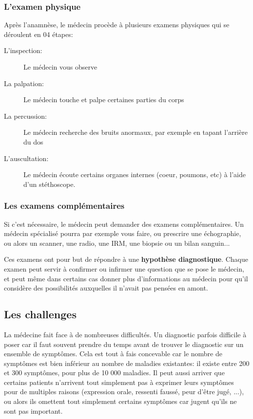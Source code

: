 \subsubsection{L'examen physique}
Après l'anamnèse, le médecin procède à plusieurs examens physiques qui se déroulent en 04 étapes:
\begin{description}
    \item[L'inspection:] Le médecin vous observe
    \item[La palpation:] Le médecin touche et palpe certaines parties du corps
    \item[La percussion:] Le médecin recherche des bruits anormaux, par exemple en tapant l'arrière du dos
    \item[L'auscultation:] Le médecin écoute certains organes internes (coeur, poumons, etc) à l'aide d'un stéthoscope.
\end{description}

\subsubsection{Les examens complémentaires}
Si c'est nécessaire, le médecin peut demander des examens complémentaires. Un médecin spécialisé pourra par exemple vous faire, ou prescrire une échographie, ou alors un scanner, une radio, une IRM, une biopsie ou un bilan sanguin...

Ces examens  ont pour but de répondre à une \textbf{hypothèse diagnostique}. Chaque examen peut servir à confirmer ou infirmer une question que se pose le médecin, et peut même dans certains cas donner plus d'informations au médecin pour qu'il considère des possibilités auxquelles il n'avait pas pensées en amont.


\subsection{Les challenges}
La médecine fait face à de nombreuses difficultés. Un diagnostic parfois difficile à poser car il faut souvent prendre du temps avant de trouver le diagnostic sur un ensemble de symptômes. Cela est tout à fais concevable car le nombre de symptômes est bien inférieur au nombre de maladies existantes: il existe entre 200 et 300 symptômes, pour plus de 10 000 maladies. Il peut aussi arriver que certains patients n'arrivent tout simplement pas à exprimer leurs symptômes pour de multiples raisons (expression orale, ressenti faussé, peur d'être jugé, ...), ou alors ils omettent tout simplement certains symptômes car jugent qu'ils ne sont pas important. 

